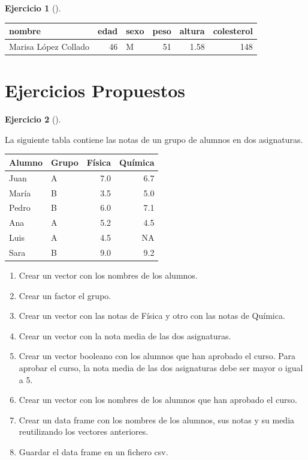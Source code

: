 \documentclass[
  a4paper,
]{scrreport}
\theoremstyle{definition}
\newtheorem{exercise}{Ejercicio}[chapter]
\theoremstyle{remark}
\begin{document}
\begin{exercise}[]
\begin{enumerate}
\begin{tcolorbox}
  \begin{longtable}[]{@{}lrlrrr@{}}
  \toprule\noalign{}
  nombre & edad & sexo & peso & altura & colesterol \\
  \midrule\noalign{}
  \endhead
  \bottomrule\noalign{}
  \endlastfoot
  Marisa López Collado & 46 & M & 51 & 1.58 & 148 \\
  \end{longtable}

  \end{tcolorbox}
\end{enumerate}

\end{exercise}

\section{Ejercicios Propuestos}\label{ejercicios-propuestos}

\begin{exercise}[]\protect\hypertarget{exr-vectores-2}{}\label{exr-vectores-2}

La siguiente tabla contiene las notas de un grupo de alumnos en dos
asignaturas.

\begin{longtable}[]{@{}llrr@{}}
\toprule\noalign{}
Alumno & Grupo & Física & Química \\
\midrule\noalign{}
\endhead
\bottomrule\noalign{}
\endlastfoot
Juan & A & 7.0 & 6.7 \\
María & B & 3.5 & 5.0 \\
Pedro & B & 6.0 & 7.1 \\
Ana & A & 5.2 & 4.5 \\
Luis & A & 4.5 & NA \\
Sara & B & 9.0 & 9.2 \\
\end{longtable}

\begin{enumerate}
\def\labelenumi{\alph{enumi}.}
\item
  Crear un vector con los nombres de los alumnos.
\item
  Crear un factor el grupo.
\item
  Crear un vector con las notas de Física y otro con las notas de
  Química.
\item
  Crear un vector con la nota media de las dos asignaturas.
\item
  Crear un vector booleano con los alumnos que han aprobado el curso.
  Para aprobar el curso, la nota media de las dos asignaturas debe ser
  mayor o igual a 5.
\item
  Crear un vector con los nombres de los alumnos que han aprobado el
  curso.
\item
  Crear un data frame con los nombres de los alumnos, sus notas y su
  media reutilizando los vectores anteriores.
\item
  Guardar el data frame en un fichero csv.
\end{enumerate}

\end{exercise}
\end{document}
